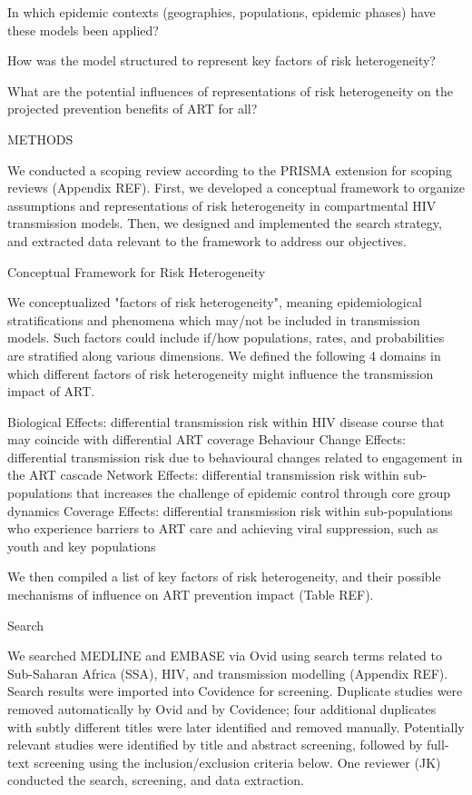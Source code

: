       In which epidemic contexts (geographies, populations, epidemic phases)
      have these models been applied?

      How was the model structured to represent key factors of risk heterogeneity?

      What are the potential influences of representations of risk heterogeneity
      on the projected prevention benefits of ART for all?

METHODS

We conducted a scoping review according to the PRISMA extension for scoping reviews
(Appendix REF).
First, we developed a conceptual framework to organize
assumptions and representations of risk heterogeneity
in compartmental HIV transmission models.
Then, we designed and implemented the search strategy,
and extracted data relevant to the framework to address our objectives.

Conceptual Framework for Risk Heterogeneity

We conceptualized "factors of risk heterogeneity", meaning
epidemiological stratifications and phenomena which may/not be included in transmission models.
Such factors could include if/how populations, rates, and probabilities
are stratified along various dimensions.
We defined the following 4 domains in which
different factors of risk heterogeneity might influence the transmission impact of ART.

   Biological Effects:
  differential transmission risk within HIV disease course
  that may coincide with differential ART coverage
   Behaviour Change Effects:
  differential transmission risk due to
  behavioural changes related to engagement in the ART cascade
   Network Effects:
  differential transmission risk within sub-populations
  that increases the challenge of epidemic control through core group dynamics
   Coverage Effects:
  differential transmission risk within sub-populations
  who experience barriers to ART care and achieving viral suppression,
  such as youth and key populations

We then compiled a list of key factors of risk heterogeneity,
and their possible mechanisms of influence on ART prevention impact (Table REF).

Search

We searched MEDLINE and EMBASE via Ovid
using search terms related to Sub-Saharan Africa (SSA), HIV, and transmission modelling
(Appendix REF).
Search results were imported into Covidence for screening.
Duplicate studies were removed automatically by Ovid and by Covidence;
four additional duplicates with subtly different titles were later identified and removed manually.
Potentially relevant studies were identified by title and abstract screening, followed 
by full-text screening using the inclusion/exclusion criteria below. 
One reviewer (JK) conducted the search, screening, and data extraction.

